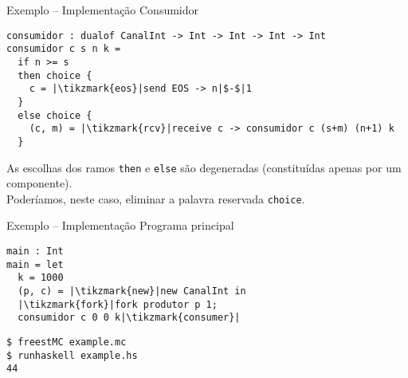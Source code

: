 \begin{frame}[fragile]{Exemplo -- Implementação  \hfill \color{mLightBrown}Consumidor}
  \begin{lstlisting}[xleftmargin=-.04\textwidth]
consumidor : dualof CanalInt -> Int -> Int -> Int -> Int
consumidor c s n k =
  if n >= s
  then choice {
    c = |\tikzmark{eos}|send EOS -> n|$-$|1
  }
  else choice {
    (c, m) = |\tikzmark{rcv}|receive c -> consumidor c (s+m) (n+1) k
  }
\end{lstlisting}


 
\begin{tcolorbox}
  As escolhas dos ramos \lstinline|then| e \lstinline|else| são degeneradas (constituídas apenas por um componente).\\
  Poderíamos, neste caso, eliminar a palavra reservada \lstinline|choice|.
\end{tcolorbox}

\end{frame}

\begin{frame}[fragile]{Exemplo -- Implementação  \hfill \color{mLightBrown}Programa principal}
  \begin{lstlisting}[xleftmargin=.2\textwidth, xrightmargin=.15\textwidth]
main : Int
main = let
  k = 1000
  (p, c) = |\tikzmark{new}|new CanalInt in
  |\tikzmark{fork}|fork produtor p 1;
  consumidor c 0 0 k|\tikzmark{consumer}|
\end{lstlisting}

\begin{verbatim}
$ freestMC example.mc
$ runhaskell example.hs
44
\end{verbatim}


\end{frame}


 
